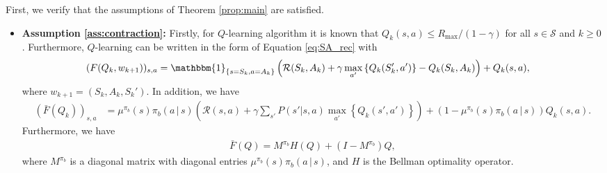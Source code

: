 \documentclass[letterpaper, 10 pt]{article}
\begin{document}
First, we verify that the assumptions of Theorem \ref{prop:main} are satisfied.
\begin{itemize}
    \item \textbf{Assumption \ref{ass:contraction}:} Firstly, for $Q$-learning algorithm it is known that $Q_k(s,a)\leq R_{\max}/(1-\gamma)$ for all $s\in\mathcal{S}$ and $k\geq 0$. Furthermore, $Q$-learning can be written in the form of Equation \eqref{eq:SA_rec} with
    \begin{align}
     (F(Q_k,w_{k+1}))_{s,a} &=\mathbbm{1}_{\{s=S_k,a=A_k\}}\left( \mathcal{R}(S_k,A_k)+\gamma\max_{a'} \left\{Q_k(S_k',a')\right\} - Q_{k}(S_k,A_k)  \right) + Q_k(s,a),\nonumber
    \end{align}
    where $w_{k+1} = (S_k,A_k,S_k')$. In addition, we have
    \begin{align*}
        (\bar{F}(Q_k))_{s,a} &= \mu^{\pi_b}(s)\pi_b(a\,|\,s) \left(\mathcal{R}(s,a) + \gamma\sum_{s'}P(s'|s,a)\max_{a'} \left\{Q_{k}(s',a') \right\} \right) + (1-\mu^{\pi_b}(s)\pi_b(a\,|\,s))Q_k(s,a).
    \end{align*}
    Furthermore, we have
    \begin{align*}
        \bar{F}(Q) = M^{\pi_b} H (Q)+(I-M^{\pi_b}) Q,
    \end{align*}
    where $M^{\pi_b}$ is a diagonal matrix with diagonal entries $\mu^{\pi_b}(s)\pi_b(a\,|\,s)$, and $H$ is the Bellman optimality operator. 


\end{itemize}
\end{document}
